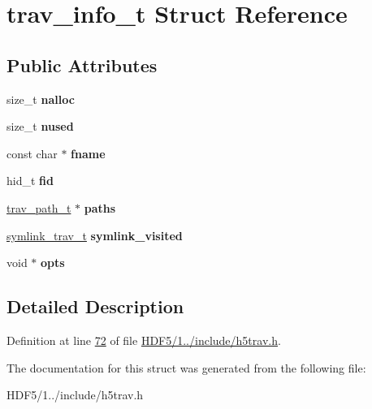 \hypertarget{structtrav__info__t}{}\section{trav\+\_\+info\+\_\+t Struct Reference}
\label{structtrav__info__t}
\subsection*{Public Attributes}
\begin{DoxyCompactItemize}
\item 
\mbox{\label{structtrav__info__t_aac42184826c4caabb6e2dfc032b1b251}} 
size\+\_\+t {\bfseries nalloc}
\item 
\mbox{\label{structtrav__info__t_ad9bb825564852bdfe43b478109fa14c2}} 
size\+\_\+t {\bfseries nused}
\item 
\mbox{\label{structtrav__info__t_a67ac5851e32221d126e35c7a29580640}} 
const char $\ast$ {\bfseries fname}
\item 
\mbox{\label{structtrav__info__t_a57e4a5519a895c630936b7a9b2d97874}} 
hid\+\_\+t {\bfseries fid}
\item 
\mbox{\label{structtrav__info__t_af1aa1e99e40c4d5d4041b4c9147963fe}} 
\hyperlink{structtrav__path__t}{trav\+\_\+path\+\_\+t} $\ast$ {\bfseries paths}
\item 
\mbox{\label{structtrav__info__t_ae4921af7d78ec68285012b70d84e0e11}} 
\hyperlink{structsymlink__trav__t}{symlink\+\_\+trav\+\_\+t} {\bfseries symlink\+\_\+visited}
\item 
\mbox{\label{structtrav__info__t_a33f96f72b4a160d792e1643f4ff5113d}} 
void $\ast$ {\bfseries opts}
\end{DoxyCompactItemize}


\subsection{Detailed Description}


Definition at line \hyperlink{_h_d_f5_21_810_81_2include_2h5trav_8h_source_l00072}{72} of file \hyperlink{_h_d_f5_21_810_81_2include_2h5trav_8h_source}{H\+D\+F5/1../include/h5trav.\+h}.



The documentation for this struct was generated from the following file\+:\begin{DoxyCompactItemize}
\item 
H\+D\+F5/1../include/h5trav.\+h\end{DoxyCompactItemize}
